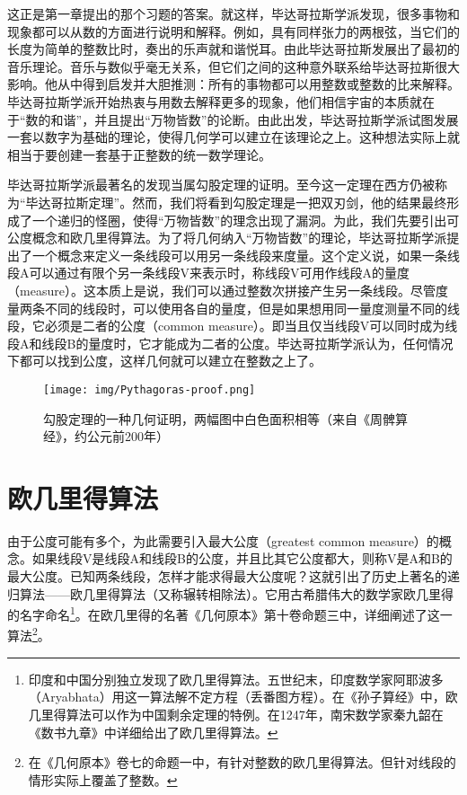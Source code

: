 \documentclass[UTF8]{article}
\begin{document}
这正是第一章提出的那个习题的答案。就这样，毕达哥拉斯学派发现，很多事物和现象都可以从数的方面进行说明和解释。例如，具有同样张力的两根弦，当它们的长度为简单的整数比时，奏出的乐声就和谐悦耳。由此毕达哥拉斯发展出了最初的音乐理论。音乐与数似乎毫无关系，但它们之间的这种意外联系给毕达哥拉斯很大影响。他从中得到启发并大胆推测：所有的事物都可以用整数或整数的比来解释。毕达哥拉斯学派开始热衷与用数去解释更多的现象，他们相信宇宙的本质就在于“数的和谐”，并且提出“万物皆数”的论断。由此出发，毕达哥拉斯学派试图发展一套以数字为基础的理论，使得几何学可以建立在该理论之上。这种想法实际上就相当于要创建一套基于正整数的统一数学理论。

 
毕达哥拉斯学派最著名的发现当属勾股定理的证明。至今这一定理在西方仍被称为“毕达哥拉斯定理”。然而，我们将看到勾股定理是一把双刃剑，他的结果最终形成了一个递归的怪圈，使得“万物皆数”的理念出现了漏洞。为此，我们先要引出可公度概念和欧几里得算法。为了将几何纳入“万物皆数”的理论，毕达哥拉斯学派提出了一个概念来定义一条线段可以用另一条线段来度量。这个定义说，如果一条线段A可以通过有限个另一条线段V来表示时，称线段V可用作线段A的量度（measure）。这本质上是说，我们可以通过整数次拼接产生另一条线段。尽管度量两条不同的线段时，可以使用各自的量度，但是如果想用同一量度测量不同的线段，它必须是二者的公度（common measure）。即当且仅当线段V可以同时成为线段A和线段B的量度时，它才能成为二者的公度。毕达哥拉斯学派认为，任何情况下都可以找到公度，这样几何就可以建立在整数之上了。

\begin{figure}[htbp]
 \centering
 \texttt{[image: img/Pythagoras-proof.png]}
 \caption{勾股定理的一种几何证明，两幅图中白色面积相等（来自《周髀算经》，约公元前200年）}
 \label{fig:Pythagoras-proof}
\end{figure}

\section{欧几里得算法}

由于公度可能有多个，为此需要引入最大公度（greatest common measure）的概念。如果线段V是线段A和线段B的公度，并且比其它公度都大，则称V是A和B的最大公度。已知两条线段，怎样才能求得最大公度呢？这就引出了历史上著名的递归算法——欧几里得算法（又称辗转相除法）。它用古希腊伟大的数学家欧几里得的名字命名\footnote{印度和中国分别独立发现了欧几里得算法。五世纪末，印度数学家阿耶波多（Aryabhata）用这一算法解不定方程（丢番图方程）。在《孙子算经》中，欧几里得算法可以作为中国剩余定理的特例。在1247年，南宋数学家秦九韶在《数书九章》中详细给出了欧几里得算法。}。在欧几里得的名著《几何原本》第十卷命题三中\cite{Elements}，详细阐述了这一算法\footnote{在《几何原本》卷七的命题一中，有针对整数的欧几里得算法。但针对线段的情形实际上覆盖了整数。}。
\end{document}

